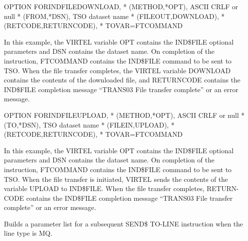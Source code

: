 \documentclass[letterpaper,10pt,english]{sphinxmanual}
\begin{document}
\begin{sphinxVerbatim}[commandchars=\\\{\}]
OPTION\PYGZdl{} FOR\PYGZhy{}IND\PYGZdl{}FILE\PYGZhy{}DOWNLOAD,                            *
    (METHOD,\PYGZsq{}*OPT\PYGZsq{}),              \PYGZdq{}ASCII CRLF\PYGZdq{} or null    *
    (FROM,\PYGZsq{}*DSN\PYGZsq{}),                 TSO dataset name       *
    (FILE\PYGZhy{}OUT,\PYGZsq{}DOWNLOAD\PYGZsq{}),                                *
    (RET\PYGZhy{}CODE,\PYGZsq{}RETURN\PYGZhy{}CODE\PYGZsq{}),                             *
    TOVAR=\PYGZsq{}FTCOMMAND\PYGZsq{}
\end{sphinxVerbatim}

In this example, the VIRTEL variable OPT contains the IND\$FILE optional parameters and DSN contains the dataset
name. On completion of the instruction, FTCOMMAND contains the IND\$FILE command to be sent to TSO. When the
file transfer completes, the VIRTEL variable DOWNLOAD contains the contents of the downloaded file, and RETURNCODE
contains the IND\$FILE completion message “TRANS03 File transfer complete” or an error message.

\begin{sphinxVerbatim}[commandchars=\\\{\}]
OPTION\PYGZdl{} FOR\PYGZhy{}IND\PYGZdl{}FILE\PYGZhy{}UPLOAD,                              *
(METHOD,\PYGZsq{}*OPT\PYGZsq{}),                    \PYGZdq{}ASCII CRLF\PYGZdq{} or null  *
(TO,\PYGZsq{}*DSN\PYGZsq{}),                             TSO dataset name *
(FILE\PYGZhy{}IN,\PYGZsq{}UPLOAD\PYGZsq{}),                                       *
(RET\PYGZhy{}CODE,\PYGZsq{}RETURN\PYGZhy{}CODE\PYGZsq{}),                                 *
TOVAR=\PYGZsq{}FTCOMMAND\PYGZsq{}
\end{sphinxVerbatim}

In this example, the VIRTEL variable OPT contains the IND\$FILE optional parameters and DSN contains the dataset
name. On completion of the instruction, FTCOMMAND contains the IND\$FILE command to be sent to TSO. When the
file transfer is initiated, VIRTEL sends the contents of the variable UPLOAD to IND\$FILE. When the file transfer
completes, RETURN-CODE contains the IND\$FILE completion message “TRANS03 File transfer complete” or an error
message.


Builds a parameter list for a subsequent SEND\$ TO-LINE instruction when the line type is MQ.
\end{document}
